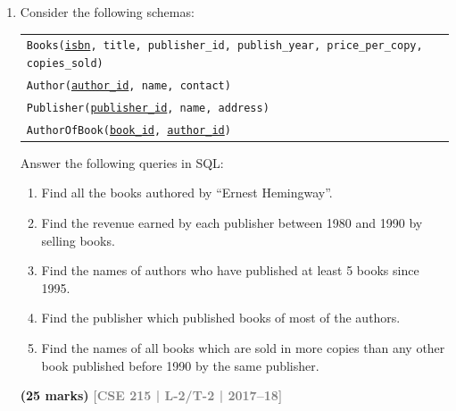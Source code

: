 \documentclass[12pt]{article}
\newcommand{\yr}[1]{\hfill\textcolor{gray}{\small\textbf{[#1]}}}
\newcommand{\mk}[1]{\textcolor{orange!70!black}{\small\textbf{(#1 marks)}}}
\begin{document}
\begin{enumerate}
\begin{center}
\end{center}
\mk{10} \yr{CSE 215 | L-2/T-2 | 2018--19}


\item Consider the following schemas:
\begin{center}
\begin{tabular}{l}
\texttt{Books(\underline{isbn}, title, publisher\_id, publish\_year, price\_per\_copy, copies\_sold)}\\
\texttt{Author(\underline{author\_id}, name, contact)}\\
\texttt{Publisher(\underline{publisher\_id}, name, address)}\\
\texttt{AuthorOfBook(\underline{book\_id}, \underline{author\_id})}
\end{tabular}
\end{center}
Answer the following queries in SQL:
\begin{enumerate}
  \item Find all the books authored by ``Ernest Hemingway''.
  \item Find the revenue earned by each publisher between 1980 and 1990 by selling books.
  \item Find the names of authors who have published at least 5 books since 1995.
  \item Find the publisher which published books of most of the authors.
  \item Find the names of all books which are sold in more copies than any other book published before 1990 by the same publisher.
\end{enumerate}
\mk{25} \yr{CSE 215 | L-2/T-2 | 2017--18}



\end{enumerate}
\end{document}
